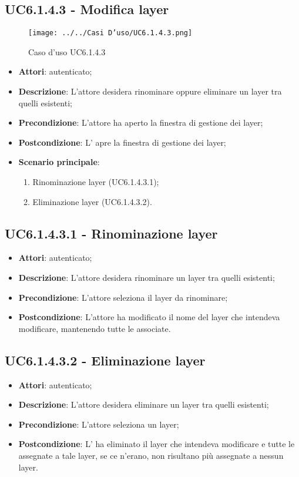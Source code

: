 \subsection{UC6.1.4.3 - Modifica layer}
\label{ssec:UC6.1.4.3}
\begin{figure}[h!]
\centering
\texttt{[image: ../../Casi D'uso/UC6.1.4.3.png]}
\caption{Caso d'uso UC6.1.4.3}
 \end{figure}
\begin{itemize}
\item \textbf{Attori}:  autenticato;
\item \textbf{Descrizione}: L'attore desidera rinominare oppure eliminare un layer tra quelli esistenti;
\item \textbf{Precondizione}: L'attore ha aperto la finestra di gestione dei layer;
\item \textbf{Postcondizione}: L' apre la finestra di gestione dei layer;
\item \textbf{Scenario principale}: \begin{enumerate}\item Rinominazione layer (UC6.1.4.3.1);\item Eliminazione layer (UC6.1.4.3.2).
 \end{enumerate}
\end{itemize}
\subsection{UC6.1.4.3.1 - Rinominazione layer}
\label{ssec:UC6.1.4.3.1}
\begin{itemize}
\item \textbf{Attori}:  autenticato;
\item \textbf{Descrizione}: L'attore desidera rinominare un layer tra quelli esistenti;
\item \textbf{Precondizione}: L'attore seleziona il layer da rinominare;
\item \textbf{Postcondizione}: L'attore ha modificato il nome del layer che intendeva modificare, mantenendo tutte le  associate.
\end{itemize}
\subsection{UC6.1.4.3.2 - Eliminazione layer}
\label{ssec:UC6.1.4.3.2}
\begin{itemize}
\item \textbf{Attori}:  autenticato;
\item \textbf{Descrizione}: L'attore desidera eliminare un layer tra quelli esistenti;
\item \textbf{Precondizione}: L'attore seleziona un layer;
\item \textbf{Postcondizione}: L' ha eliminato il layer che intendeva modificare e tutte le  assegnate a tale layer, se ce n'erano, non risultano più assegnate a nessun layer.
\end{itemize}
\newpage
